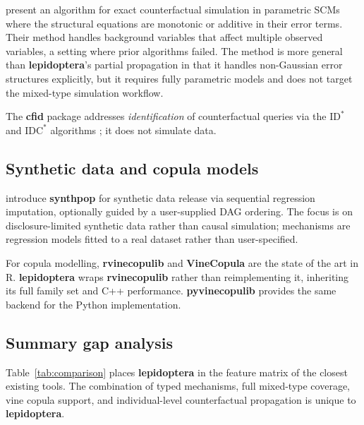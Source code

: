 \documentclass[12pt,a4paper]{article}
\newcommand{\pkg}[1]{\textbf{#1}}
\newcommand{\proglang}[1]{\textsf{#1}}
\begin{document}
\citet{karvanen2024simcf} present an algorithm for exact counterfactual simulation
in parametric SCMs where the structural equations are monotonic or additive in
their error terms. Their method handles background variables that affect multiple
observed variables, a setting where prior algorithms failed. The method is more
general than \pkg{lepidoptera}'s partial propagation in that it handles
non-Gaussian error structures explicitly, but it requires fully parametric models
and does not target the mixed-type simulation workflow.

The \pkg{cfid} package \citep{tikka2022cfid} addresses \emph{identification} of
counterfactual queries via the $\mathrm{ID}^*$ and $\mathrm{IDC}^*$ algorithms
\citep{shpitser2007id}; it does not simulate data.

\subsection{Synthetic data and copula models}

\citet{nowok2016synthpop} introduce \pkg{synthpop} for synthetic data release via
sequential regression imputation, optionally guided by a user-supplied DAG ordering.
The focus is on disclosure-limited synthetic data rather than causal simulation;
mechanisms are regression models fitted to a real dataset rather than user-specified.

For copula modelling, \pkg{rvinecopulib} \citep{nagler2022rvinecopulib} and
\pkg{VineCopula} \citep{nagler2022rvinecopulib} are the state of the art in
\proglang{R}. \pkg{lepidoptera} wraps \pkg{rvinecopulib} rather than
reimplementing it, inheriting its full family set and C++ performance.
\pkg{pyvinecopulib} \citep{pyvinecopulib2024} provides the same backend for the
\proglang{Python} implementation.

\subsection{Summary gap analysis}

Table~\ref{tab:comparison} places \pkg{lepidoptera} in the feature matrix of the
closest existing tools. The combination of typed mechanisms, full mixed-type
coverage, vine copula support, and individual-level counterfactual propagation is
unique to \pkg{lepidoptera}.
\end{document}
